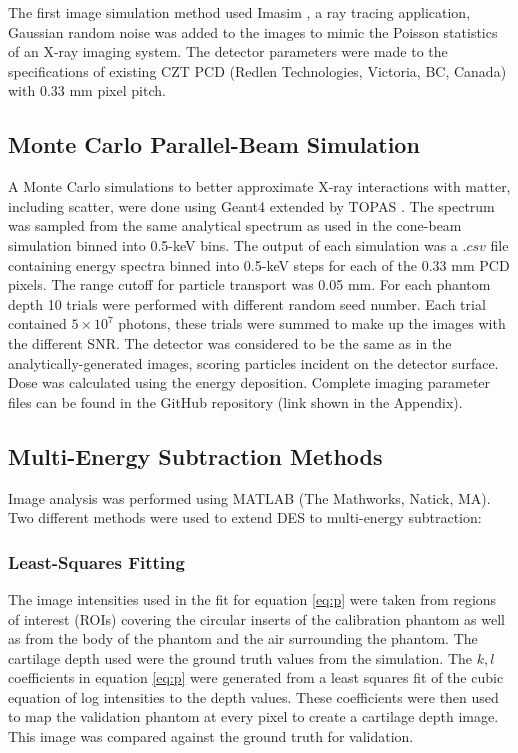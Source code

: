 \documentclass[a4paper,11pt]{article}
\begin{document}
The first image simulation method used Imasim \cite{Landry2013ImaSimRadiology}, a ray tracing application, Gaussian random noise was added to the images to mimic the Poisson statistics of an X-ray imaging system. The detector parameters were made to the specifications of existing CZT PCD (Redlen Technologies, Victoria, BC, Canada) with 0.33 mm pixel pitch.

\subsection{Monte Carlo Parallel-Beam Simulation}

A Monte Carlo simulations to better approximate X-ray interactions with matter, including scatter, were done using Geant4 \cite{Agostinelli2003Geant4Toolkit} extended by TOPAS \cite{Perl2012TOPAS:Applications}. The spectrum was sampled from the same analytical spectrum as used in the cone-beam simulation binned into 0.5-keV bins. The output of each simulation was a $.csv$ file containing energy spectra binned into 0.5-keV steps for each  of the 0.33 mm PCD pixels. The range cutoff for particle transport was 0.05 mm. For each phantom depth 10 trials were performed with different random seed number. Each trial contained $5 \times 10^7$ photons, these trials were summed to make up the images with the different SNR. The detector was considered to be the same as in the analytically-generated images, scoring particles incident on the detector surface. Dose was calculated using the energy deposition. Complete imaging parameter files can be found in the GitHub repository (link shown in the Appendix).

\subsection{Multi-Energy Subtraction Methods}

Image analysis was performed using MATLAB (The Mathworks, Natick, MA). Two different methods were used to extend DES to multi-energy subtraction:

\subsubsection{Least-Squares Fitting}

The image intensities used in the fit for equation \ref{eq:p} were taken from regions of interest (ROIs) covering the circular inserts of the calibration phantom as well as from the body of the phantom and the air surrounding the phantom. The cartilage depth used were the ground truth values from the simulation. The ${k}, {l}$ coefficients in equation \ref{eq:p} were generated from a least squares fit of the cubic equation of log intensities to the depth values. These coefficients were then used to map the validation phantom at every pixel to create a cartilage depth image. This image was compared against the ground truth for validation.
\end{document}
